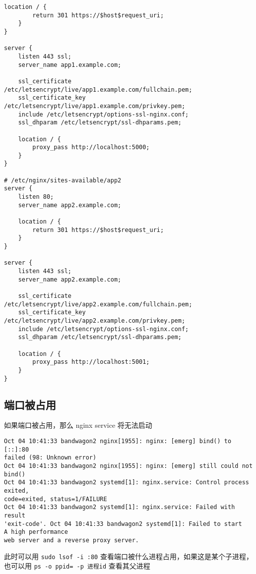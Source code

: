 \begin{itemize}
\begin{lstlisting}[language=none]
    location / {
        return 301 https://$host$request_uri;
    }
}

server {
    listen 443 ssl;
    server_name app1.example.com;

    ssl_certificate /etc/letsencrypt/live/app1.example.com/fullchain.pem;
    ssl_certificate_key /etc/letsencrypt/live/app1.example.com/privkey.pem;
    include /etc/letsencrypt/options-ssl-nginx.conf;
    ssl_dhparam /etc/letsencrypt/ssl-dhparams.pem;

    location / {
        proxy_pass http://localhost:5000;
    }
}

# /etc/nginx/sites-available/app2
server {
    listen 80;
    server_name app2.example.com;

    location / {
        return 301 https://$host$request_uri;
    }
}

server {
    listen 443 ssl;
    server_name app2.example.com;

    ssl_certificate /etc/letsencrypt/live/app2.example.com/fullchain.pem;
    ssl_certificate_key /etc/letsencrypt/live/app2.example.com/privkey.pem;
    include /etc/letsencrypt/options-ssl-nginx.conf;
    ssl_dhparam /etc/letsencrypt/ssl-dhparams.pem;

    location / {
        proxy_pass http://localhost:5001;
    }
}
\end{lstlisting}
\end{itemize}

\subsection{端口被占用}
如果端口被占用，那么 nginx service 将无法启动
\begin{lstlisting}[language=none]
Oct 04 10:41:33 bandwagon2 nginx[1955]: nginx: [emerg] bind() to [::]:80
failed (98: Unknown error)
Oct 04 10:41:33 bandwagon2 nginx[1955]: nginx: [emerg] still could not bind()
Oct 04 10:41:33 bandwagon2 systemd[1]: nginx.service: Control process exited,
code=exited, status=1/FAILURE
Oct 04 10:41:33 bandwagon2 systemd[1]: nginx.service: Failed with result
'exit-code'. Oct 04 10:41:33 bandwagon2 systemd[1]: Failed to start
A high performance
web server and a reverse proxy server.
\end{lstlisting}
此时可以用 \verb`sudo lsof -i :80` 查看端口被什么进程占用，如果这是某个子进程，也可以用 \verb`ps -o ppid= -p 进程id` 查看其父进程
